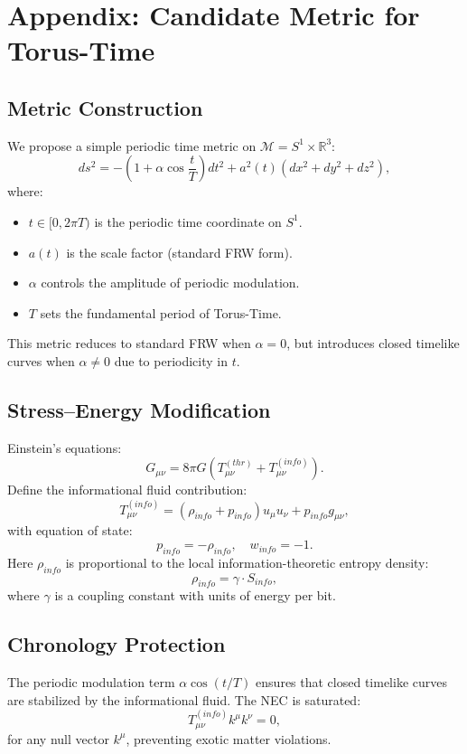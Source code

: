 \documentclass[12pt,openany]{book}
\theoremstyle{plain}
\theoremstyle{definition}
\theoremstyle{remark}
\begin{document}
\chapter{Appendix: Candidate Metric for Torus-Time}

\section{Metric Construction}
We propose a simple periodic time metric on $\mathcal{M} = S^1 \times \mathbb{R}^3$:
\[
ds^2 = -\left(1 + \alpha \cos\frac{t}{T}\right) dt^2 + a^2(t)\left(dx^2 + dy^2 + dz^2\right),
\]
where:
\begin{itemize}
    \item $t \in [0,2\pi T)$ is the periodic time coordinate on $S^1$.
    \item $a(t)$ is the scale factor (standard FRW form).
    \item $\alpha$ controls the amplitude of periodic modulation.
    \item $T$ sets the fundamental period of Torus-Time.
\end{itemize}

This metric reduces to standard FRW when $\alpha=0$, but introduces closed timelike curves when $\alpha \neq 0$ due to periodicity in $t$.

\section{Stress–Energy Modification}
Einstein’s equations:
\[
G_{\mu\nu} = 8\pi G \left(T_{\mu\nu}^{(thr)} + T_{\mu\nu}^{(info)}\right).
\]
Define the informational fluid contribution:
\[
T_{\mu\nu}^{(info)} = \left(\rho_{info} + p_{info}\right)u_\mu u_\nu + p_{info} g_{\mu\nu},
\]
with equation of state:
\[
p_{info} = -\rho_{info}, \quad w_{info} = -1.
\]
Here $\rho_{info}$ is proportional to the local information-theoretic entropy density:
\[
\rho_{info} = \gamma \cdot S_{info},
\]
where $\gamma$ is a coupling constant with units of energy per bit.

\section{Chronology Protection}
The periodic modulation term $\alpha \cos(t/T)$ ensures that closed timelike curves are stabilized by the informational fluid. The NEC is saturated:
\[
T_{\mu\nu}^{(info)} k^\mu k^\nu = 0,
\]
for any null vector $k^\mu$, preventing exotic matter violations.
\end{document}
